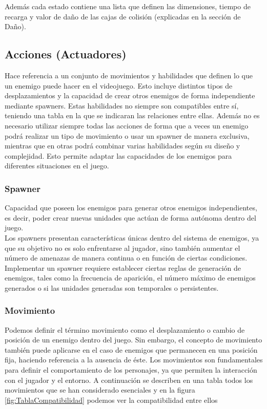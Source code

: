 Además cada estado contiene una lista que definen las dimensiones, tiempo de recarga y valor de daño de las cajas de colisión (explicadas en la sección de Daño).

\subsection{Acciones (Actuadores)}
Hace referencia a un conjunto de movimientos y habilidades que definen lo que un enemigo puede hacer en el videojuego. Esto incluye distintos tipos de desplazamientos y la capacidad de crear otros enemigos de forma independiente mediante spawners. Estas habilidades no siempre son compatibles entre sí, teniendo una tabla en la que se indicaran las relaciones entre ellas. Además no es necesario utilizar siempre todas las acciones de forma que a veces un enemigo podrá realizar un tipo de movimiento o usar un spawner de manera exclusiva, mientras que en otras podrá combinar varias habilidades según su diseño y complejidad. Esto permite adaptar las capacidades de los enemigos para diferentes situaciones en el juego.
\subsubsection{Spawner}
Capacidad que poseen los enemigos para generar otros enemigos independientes, es decir, poder crear nuevas unidades que actúan de forma autónoma dentro del juego.\\
Los spawners presentan características únicas dentro del sistema de enemigos, ya que su objetivo no es solo enfrentarse al jugador, sino también aumentar el número de amenazas de manera continua o en función de ciertas condiciones.
Implementar un spawner requiere establecer ciertas reglas de generación de enemigos, tales como la frecuencia de aparición, el número máximo de enemigos generados o si las unidades generadas son temporales o persistentes.
\subsubsection{Movimiento}
Podemos definir el término movimiento como el desplazamiento o cambio de posición de un enemigo dentro del juego. Sin embargo, el concepto de movimiento también puede aplicarse en el caso de enemigos que permanecen en una posición fija, haciendo referencia a la ausencia de éste. Los movimientos son fundamentales para definir el comportamiento de los personajes, ya que permiten la interacción con el jugador y el entorno.
A continuación se describen en una tabla todos los movimientos que se han considerado esenciales y en la figura \ref{fig:TablaCompatibilidad} podemos ver la compatibilidad entre ellos

